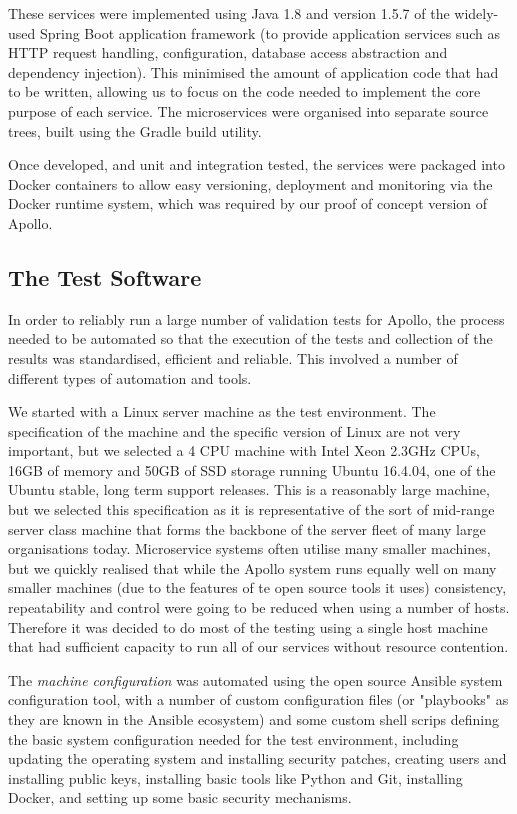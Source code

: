 These services were implemented using Java 1.8 and version 1.5.7 of the widely-used Spring Boot application framework (to provide application services such as HTTP request handling, configuration, database access abstraction and dependency injection).  This minimised the amount of application code that had to be written, allowing us to focus on the code needed to implement the core purpose of each service.  The microservices were organised into separate source trees, built using the Gradle build utility.

 Once developed, and unit and integration tested, the services were packaged into Docker containers to allow easy versioning, deployment and monitoring via the Docker runtime system, which was required by our proof of concept version of Apollo.

\subsection{The Test Software}

In order to reliably run a large number of validation tests for Apollo, the process needed to be automated so that the execution of the tests and collection of the results was standardised, efficient and reliable.  This involved a number of different types of automation and tools.

We started with a Linux server machine as the test environment.  The specification of the machine and the specific version of Linux are not very important, but we selected a 4 CPU machine with Intel Xeon 2.3GHz CPUs, 16GB of memory and 50GB of SSD storage running Ubuntu 16.4.04, one of the Ubuntu stable, long term support releases.  This is a reasonably large machine, but we selected this specification as it is representative of the sort of mid-range server class machine that forms the backbone of the server fleet of many large organisations today.  Microservice systems often utilise many smaller machines, but we quickly realised that while the Apollo system runs equally well on many smaller machines (due to the features of te open source tools it uses) consistency, repeatability and control were going to be reduced when using a number of hosts.  Therefore it was decided to do most of the testing using a single host machine that had sufficient capacity to run all of our services without resource contention.

The \emph{machine configuration} was automated using the open source Ansible system configuration tool, with a number of custom configuration files (or "playbooks" as they are known in the Ansible ecosystem) and some custom shell scrips defining the basic system configuration needed for the test environment, including updating the operating system and installing security patches, creating users and installing public keys, installing basic tools like Python and Git, installing Docker, and setting up some basic security mechanisms.

